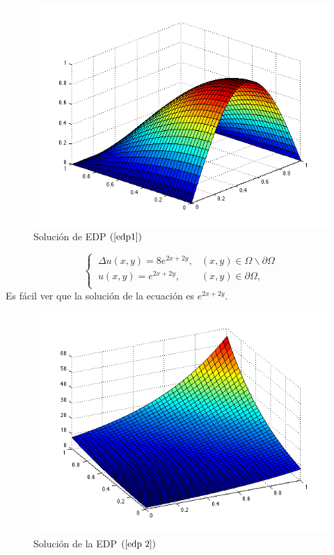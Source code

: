 \documentclass[11pt,a4paper]{article}
\begin{document}
\begin{figure}[H]
\centering
\includegraphics[scale=.5]{u1.png}
\caption{Solución de EDP $(\ref{edp1})$}
\end{figure}
\begin{equation}
\left \lbrace \begin{array}{cc}
\ \Delta u(x,y)=8e^{2x+2y}, & (x,y) \in \Omega\backslash \partial \Omega \\
\ u(x,y)=e^{2x+2y}, & (x,y)\in \partial \Omega, \\
\end{array} \right.
\label{edp 2}
\end{equation}
Es fácil ver que la solución de la ecuación es $e^{2x+2y}$. 
\begin{figure}[H]
\centering
\includegraphics[scale=.5]{u3.png}
\caption{Solución de la EDP $(\ref{edp 2})$}
\end{figure}
\end{document}
